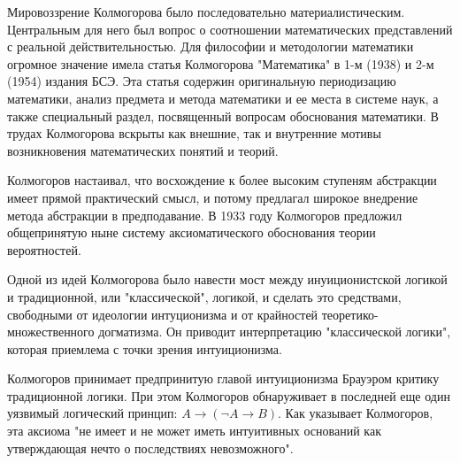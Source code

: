 \documentclass[a4paper,14pt]{extreport}
\begin{document}
Мировоззрение Колмогорова было последовательно материалистическим. Центральным для него был вопрос о соотношении математических представлений с реальной действительностью. Для философии и методологии математики огромное значение имела статья Колмогорова "Математика" в 1-м (1938) и 2-м (1954) издания БСЭ. Эта статья содержин оригинальную периодизацию математики, анализ предмета и метода математики и ее места в системе наук, а также специальный раздел, посвященный вопросам обоснования математики.
В трудах Колмогорова вскрыты как внешние, так и внутренние мотивы возникновения математических понятий и теорий.

Колмогоров настаивал, что восхождение к более высоким ступеням абстракции имеет прямой практический смысл, и потому предлагал широкое внедрение метода абстракции в предподавание. В 1933 году Колмогоров предложил общепринятую ныне систему аксиоматического обоснования теории вероятностей.

Одной из идей Колмогорова было навести мост между инуиционистской логикой и традиционной, или "классической", логикой, и сделать это средствами, свободными от идеологии интуционизма и от крайностей теоретико-множественного догматизма. Он приводит интерпретацию "классической логики", которая приемлема с точки зрения интуиционизма.

Колмогоров принимает предпринитую главой интуиционизма Брауэром критику традиционной логики. При этом Колмогоров обнаруживает в последней еще один уязвимый логический принцип: $A \to (\neg A \to B)$. Как указывает Колмогоров, эта аксиома "не имеет и не может иметь интуитивных оснований как утверждающая нечто о последствиях невозможного".
\cite{uspensky2002}
\end{document}
